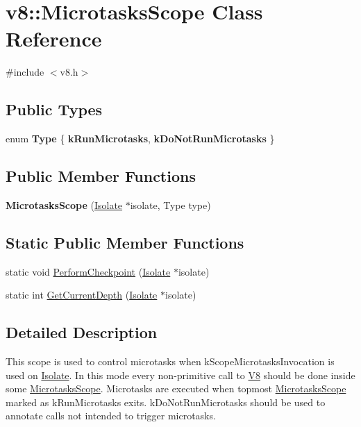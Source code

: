 \hypertarget{classv8_1_1MicrotasksScope}{}\section{v8\+:\+:Microtasks\+Scope Class Reference}
\label{classv8_1_1MicrotasksScope}


{\ttfamily \#include $<$v8.\+h$>$}

\subsection*{Public Types}
\begin{DoxyCompactItemize}
\item 
enum {\bfseries Type} \{ {\bfseries k\+Run\+Microtasks}, 
{\bfseries k\+Do\+Not\+Run\+Microtasks}
 \}\hypertarget{classv8_1_1MicrotasksScope_a826cf210978221741a0467cd9be6996f}{}\label{classv8_1_1MicrotasksScope_a826cf210978221741a0467cd9be6996f}

\end{DoxyCompactItemize}
\subsection*{Public Member Functions}
\begin{DoxyCompactItemize}
\item 
{\bfseries Microtasks\+Scope} (\hyperlink{classv8_1_1Isolate}{Isolate} $\ast$isolate, Type type)\hypertarget{classv8_1_1MicrotasksScope_a40348ac94c7e9ea405c2546d94d9d927}{}\label{classv8_1_1MicrotasksScope_a40348ac94c7e9ea405c2546d94d9d927}

\end{DoxyCompactItemize}
\subsection*{Static Public Member Functions}
\begin{DoxyCompactItemize}
\item 
static void \hyperlink{classv8_1_1MicrotasksScope_a1995095b585828067d367d5362bef65e}{Perform\+Checkpoint} (\hyperlink{classv8_1_1Isolate}{Isolate} $\ast$isolate)
\item 
static int \hyperlink{classv8_1_1MicrotasksScope_ad49e24bc69b61d7a67045cf658da1fce}{Get\+Current\+Depth} (\hyperlink{classv8_1_1Isolate}{Isolate} $\ast$isolate)
\end{DoxyCompactItemize}


\subsection{Detailed Description}
This scope is used to control microtasks when k\+Scope\+Microtasks\+Invocation is used on \hyperlink{classv8_1_1Isolate}{Isolate}. In this mode every non-\/primitive call to \hyperlink{classv8_1_1V8}{V8} should be done inside some \hyperlink{classv8_1_1MicrotasksScope}{Microtasks\+Scope}. Microtasks are executed when topmost \hyperlink{classv8_1_1MicrotasksScope}{Microtasks\+Scope} marked as k\+Run\+Microtasks exits. k\+Do\+Not\+Run\+Microtasks should be used to annotate calls not intended to trigger microtasks. 


